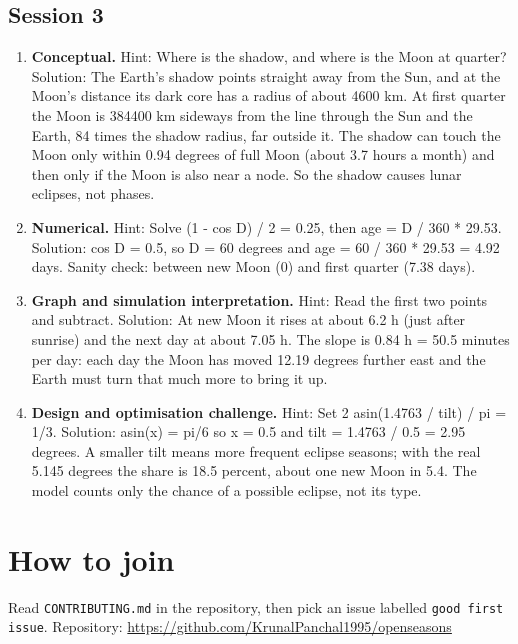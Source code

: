 \documentclass[11pt,a4paper]{article}
\begin{document}
\subsection*{Session 3}
\begin{enumerate}[nosep]
\item \textbf{Conceptual.} Hint: Where is the shadow, and where is the Moon at quarter? Solution: The Earth's shadow points straight away from the Sun, and at the Moon's distance its dark core has a radius of about 4600 km. At first quarter the Moon is 384400 km sideways from the line through the Sun and the Earth, 84 times the shadow radius, far outside it. The shadow can touch the Moon only within 0.94 degrees of full Moon (about 3.7 hours a month) and then only if the Moon is also near a node. So the shadow causes lunar eclipses, not phases.
\item \textbf{Numerical.} Hint: Solve (1 - cos D) / 2 = 0.25, then age = D / 360 * 29.53. Solution: cos D = 0.5, so D = 60 degrees and age = 60 / 360 * 29.53 = 4.92 days. Sanity check: between new Moon (0) and first quarter (7.38 days).
\item \textbf{Graph and simulation interpretation.} Hint: Read the first two points and subtract. Solution: At new Moon it rises at about 6.2 h (just after sunrise) and the next day at about 7.05 h. The slope is 0.84 h = 50.5 minutes per day: each day the Moon has moved 12.19 degrees further east and the Earth must turn that much more to bring it up.
\item \textbf{Design and optimisation challenge.} Hint: Set 2 asin(1.4763 / tilt) / pi = 1/3. Solution: asin(x) = pi/6 so x = 0.5 and tilt = 1.4763 / 0.5 = 2.95 degrees. A smaller tilt means more frequent eclipse seasons; with the real 5.145 degrees the share is 18.5 percent, about one new Moon in 5.4. The model counts only the chance of a possible eclipse, not its type.
\end{enumerate}

\section{How to join}
Read \texttt{CONTRIBUTING.md} in the repository, then pick an issue labelled \texttt{good first issue}. Repository: \url{https://github.com/KrunalPanchal1995/openseasons}
\end{document}
